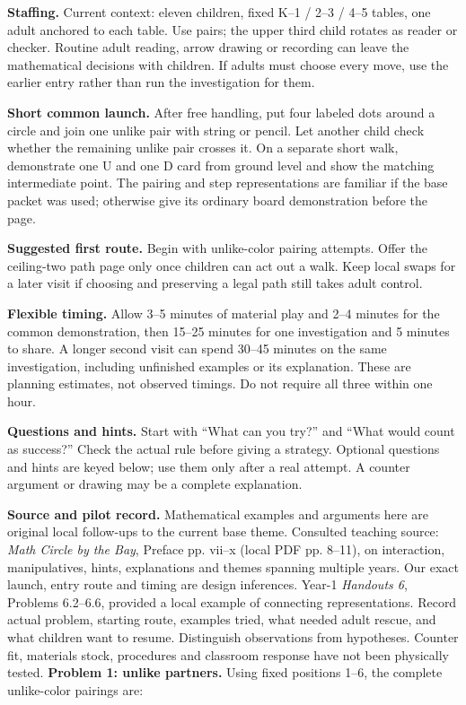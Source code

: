 \documentclass[11pt]{article}
\begin{document}
\textbf{Staffing.} Current context: eleven children, fixed K--1 / 2--3 / 4--5 tables, one adult anchored to each table. Use pairs; the upper third child rotates as reader or checker. Routine adult reading, arrow drawing or recording can leave the mathematical decisions with children. If adults must choose every move, use the earlier entry rather than run the investigation for them.

\textbf{Short common launch.} After free handling, put four labeled dots around a circle and join one unlike pair with string or pencil. Let another child check whether the remaining unlike pair crosses it. On a separate short walk, demonstrate one U and one D card from ground level and show the matching intermediate point. The pairing and step representations are familiar if the base packet was used; otherwise give its ordinary board demonstration before the page.

\textbf{Suggested first route.} Begin with unlike-color pairing attempts. Offer the ceiling-two path page only once children can act out a walk. Keep local swaps for a later visit if choosing and preserving a legal path still takes adult control.

\textbf{Flexible timing.} Allow 3--5 minutes of material play and 2--4 minutes for the common demonstration, then 15--25 minutes for one investigation and 5 minutes to share. A longer second visit can spend 30--45 minutes on the same investigation, including unfinished examples or its explanation. These are planning estimates, not observed timings. Do not require all three within one hour.

\textbf{Questions and hints.} Start with ``What can you try?'' and ``What would count as success?'' Check the actual rule before giving a strategy. Optional questions and hints are keyed below; use them only after a real attempt. A counter argument or drawing may be a complete explanation.

\textbf{Source and pilot record.} Mathematical examples and arguments here are original local follow-ups to the current base theme. Consulted teaching source: \emph{Math Circle by the Bay}, Preface pp. vii--x (local PDF pp. 8--11), on interaction, manipulatives, hints, explanations and themes spanning multiple years. Our exact launch, entry route and timing are design inferences. Year-1 \emph{Handouts 6}, Problems 6.2--6.6, provided a local example of connecting representations. Record actual problem, starting route, examples tried, what needed adult rescue, and what children want to resume. Distinguish observations from hypotheses. Counter fit, materials stock, procedures and classroom response have not been physically tested.
\newpage
\textbf{Problem 1: unlike partners.} Using fixed positions 1–6, the complete unlike-color pairings are:
\end{document}
